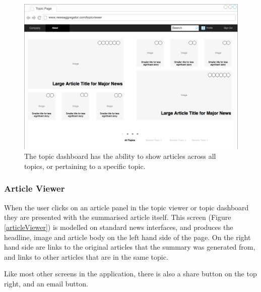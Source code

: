 \documentclass[12pt]{article}
\begin{document}
\label{topicdashboard}

\begin{figure}[ht!]
  \centering
    \includegraphics[scale=0.3]{TopicDashboard.png}
   \caption[A wireframe of the Topic Dashboard]{The topic dashboard has the ability to show articles across all topics, or pertaining to a specific topic.}
   \label{topicDashboard}
\end{figure}

\subsubsection{Article Viewer}

When the user clicks on an article panel in the topic viewer or topic dashboard they are presented with the summarised article itself. This screen (Figure \ref{articleViewer}) is modelled on standard news interfaces, and produces the headline, image and article body on the left hand side of the page. On the right hand side are links to the original articles that the summary was generated from, and links to other articles that are in the same topic. 

Like most other screens in the application, there is also a share button on the top right, and an email button.

\label{articleviewer}
\end{document}
